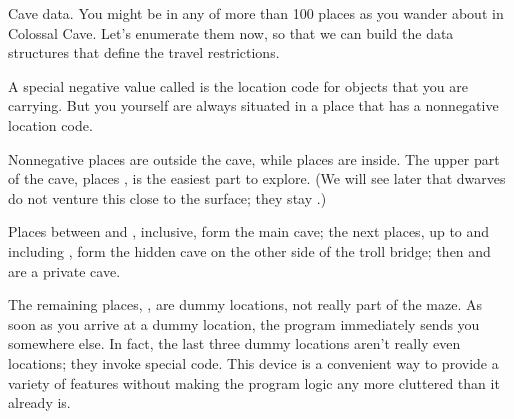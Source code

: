 Cave data. You might be in any of more than 100 places as you wander
about in Colossal Cave. Let's enumerate them now, so that we can
build the data structures that define the travel restrictions.

A special negative value called  is the location code for
objects that
you are carrying. But you yourself are always situated in a place that has a
nonnegative location code.

Nonnegative places  are outside the cave, while places %
are inside.  The upper part of the cave, places , is the
easiest part
to explore.  (We will see later that dwarves do not venture this close to the
surface; they stay .)

Places between  and , inclusive, form the main
cave;
the next places, up to and including , form the hidden cave on the
other side of the troll bridge; then  and  are a
private cave.

The remaining places, , are dummy locations,
not really part of the maze. As soon as you arrive at a dummy
location, the program immediately sends you somewhere else.
In fact, the last three dummy locations aren't really even locations;
they invoke special code.
This device is a convenient way to provide a variety of features without
making the program logic any more cluttered than it already is.

